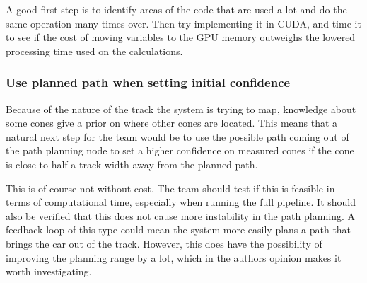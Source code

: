 A good first step is to identify areas of the code that are used a lot and do the same operation many times over. Then try implementing it in CUDA, and time it to see if the cost of moving variables to the GPU memory outweighs the lowered processing time used on the calculations. 

\subsubsection{Use planned path when setting initial confidence}
Because of the nature of the track the system is trying to map, knowledge about some cones give a prior on where other cones are located. This means that a natural next step for the team would be to use the possible path coming out of the path planning node to set a higher confidence on measured cones if the cone is close to half a track width away from the planned path. 

This is of course not without cost. The team should test if this is feasible in terms of computational time, especially when running the full pipeline. It should also be verified that this does not cause more instability in the path planning. A feedback loop of this type could mean the system more easily plans a path that brings the car out of the track. However, this does have the possibility of improving the planning range by a lot, which in the authors opinion makes it worth investigating.